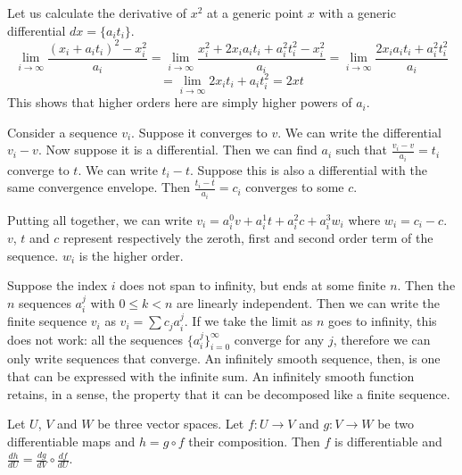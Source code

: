 \documentclass[11pt,letterpaper,fleqn]{memoir}
\begin{document}
\begin{remark}
	Let us calculate the derivative of $x^2$ at a generic point $x$ with a generic differential $dx = \{a_i t_i\}$.
	$$ \lim\limits_{i \to \infty} \frac{(x_i + a_i t_i)^2 - x_i^2}{a_i} = \lim\limits_{i \to \infty} \frac{x_i^2 + 2 x_i a_i t_i + a_i^2t_i^2 - x_i^2}{a_i} = \lim\limits_{i \to \infty} \frac{2 x_i a_i t_i + a_i^2t_i^2}{a_i}$$
	$$= \lim\limits_{i \to \infty} 2 x_i t_i + a_i t_i^2=2xt$$
	This shows that higher orders here are simply higher powers of $a_i$.
\end{remark}

\begin{remark}
	Consider a sequence $v_i$. Suppose it converges to $v$. We can write the differential $v_i - v$. Now suppose it is a differential. Then we can find $a_i$ such that $\frac{v_i - v}{a_i} = t_i$ converge to $t$. We can write $t_i - t$. Suppose this is also a differential with the same convergence envelope. Then $\frac{t_i - t}{a_i} = c_i$ converges to some $c$.
	
	Putting all together, we can write $v_i = a_i^0 v + a_i^1 t + a_i^2 c + a_i^3 w_i$ where $w_i = c_i - c$. $v$, $t$ and $c$ represent respectively the zeroth, first and second order term of the sequence. $w_i$ is the higher order.
	
	Suppose the index $i$ does not span to infinity, but ends at some finite $n$. Then the $n$ sequences $a_i^j$ with $0 \leq k < n$ are linearly independent. Then we can write the finite sequence $v_i$ as $v_i = \sum c_j a_i^j$. If we take the limit as $n$ goes to infinity, this does not work: all the sequences $\{a_i^j\}_{i=0}^\infty$ converge for any $j$, therefore we can only write sequences that converge. An infinitely smooth sequence, then, is one that can be expressed with the infinite sum. An infinitely smooth function retains, in a sense, the property that it can be decomposed like a finite sequence.
\end{remark}


\begin{prop}
	Let $U$, $V$ and $W$ be three vector spaces. Let $f : U \to V$ and $g : V \to W$ be two differentiable maps and $h = g \circ f$ their composition. Then $f$ is differentiable and $\frac{dh}{dU} = \frac{dg}{dV} \circ \frac{df}{dU}$.
\end{prop}
\end{document}
